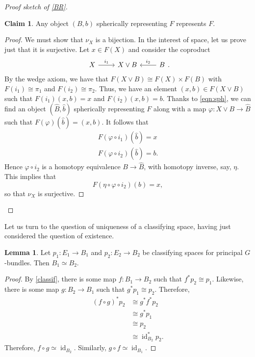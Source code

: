 \documentclass[10pt,letterpaper,cm]{nupset}
\theoremstyle{definition}
\theoremstyle{theorem}
\newtheorem{lemma}[defn]{Lemma}
\newtheorem*{claim}{Claim}
\theoremstyle{remark}
\newcommand{\1}{\mathbb{1}}
\newcommand{\0}{\vec 0}
\DeclareMathOperator{\id}{id}
\begin{document}
\begin{proof}[Proof sketch of \cref{BR}]
\begin{claim}
Any object $\left(B, b\right)$ spherically representing $F$ represents $F$.
\end{claim}
\begin{proof}
We must show that $\nu_X$ is a bijection. In the interest of space, let us prove just that it is surjective.  Let $x\in F(X)$ and consider the coproduct
\[
\begin{tikzcd}
X \arrow[r, "i_1"] & X\vee B & B \arrow[l, "i_2"']
\end{tikzcd}.
\] By the wedge axiom, we have that $F(X\vee B) \cong F(X)\times F(B)$ with $F(i_1) \cong \pi_1$ and $F(i_2) \cong \pi_2$. Thus, we have an element $\left(x,b\right) \in F(X\vee B)$ such that $F(i_1)(x,b) = x$ and $F(i_2)(x,b) =b$. Thanks to \eqref{eqn:sph}, we can find an object $\left(\widehat{B}, \hat{b}\right)$ spherically representing $F$ along with a map $\varphi : X \vee B \to \widehat{B}$ such that $F(\varphi)\left(\hat{b}\right) = \left(x, b\right)$. It follows that
\begin{gather*}
F(\varphi \circ i_1)\left(\hat{b}\right) = x
\\  F(\varphi \circ i_2)\left(\hat{b}\right) = b.
\end{gather*} Hence $\varphi \circ i_2$ is a homotopy equivalence $B \to \widehat{B}$, with homotopy inverse, say, $\eta$. This implies that $$F(\eta \circ \varphi \circ i_2)(b) = x,$$ so that $\nu_X$ is surjective.
\end{proof}

\end{proof}

\medskip

Let us turn to the question of uniqueness of a classifying space, having just considered the question of existence.

\begin{lemma}\label{uniq}
Let $p_1: E_1 \to B_1$ and $p_2 : E_2 \to B_2$ be classifying spaces for principal $G$-bundles. Then $B_1 \simeq B_2$. 
\end{lemma}
\begin{proof}
By \cref{classif}, there is some map $f : B_1 \to B_2$ such that $f^{\ast}{p_2} \cong  p_1$. Likewise, there is some map $g: B_2 \to B_1$ such that $g^{\ast}{p_1}\cong p_2$. Therefore, 
\begin{align*}
\left(f \circ g\right)^{\ast}{p_2} & \cong g^{\ast}{f^{\ast}{p_2}} 
\\ & \cong g^{\ast}{p_1}
\\ & \cong p_2
\\ & \cong \id_{B_2}^{\ast}{p_2}.
\end{align*}
Therefore, $f \circ g \simeq \id_{B_2}$. Similarly, $g\circ f \simeq \id_{B_1}$.
\end{proof}
\end{document}
